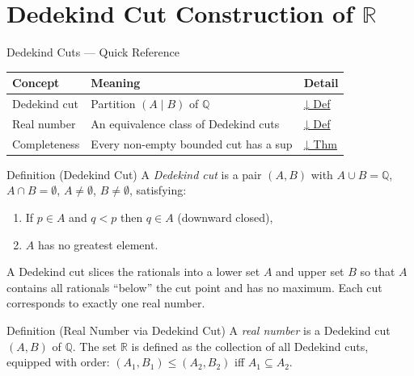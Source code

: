 
\section{Dedekind Cut Construction of $\mathbb{R}$}

\begin{toolkitbox}{Dedekind Cuts — Quick Reference}
\small
\begin{tabular}{l l l}
\toprule
\textbf{Concept} & \textbf{Meaning} & \textbf{Detail} \\
\midrule
Dedekind cut  & Partition $(A \mid B)$ of $\mathbb{Q}$ & \hyperref[def:dedekind-cut]{↓ Def} \\
Real number   & An equivalence class of Dedekind cuts & \hyperref[def:real-as-cut]{↓ Def} \\
Completeness  & Every non-empty bounded cut has a sup & \hyperref[thm:dedekind-complete]{↓ Thm} \\
\bottomrule
\end{tabular}
\end{toolkitbox}


\begin{definitionbox}{Definition (Dedekind Cut)}
\label{def:dedekind-cut}
A \emph{Dedekind cut} is a pair $(A, B)$ with $A \cup B = \mathbb{Q}$,
$A \cap B = \emptyset$, $A \neq \emptyset$, $B \neq \emptyset$, satisfying:
\begin{enumerate}
  \item If $p \in A$ and $q < p$ then $q \in A$ \quad (downward closed),
  \item $A$ has no greatest element.
\end{enumerate}
\end{definitionbox}

\begin{remark*}
A Dedekind cut slices the rationals into a lower set $A$ and upper set $B$
so that $A$ contains all rationals ``below'' the cut point and has no maximum.
Each cut corresponds to exactly one real number.
\end{remark*}

\begin{definitionbox}{Definition (Real Number via Dedekind Cut)}
\label{def:real-as-cut}
A \emph{real number} is a Dedekind cut $(A, B)$ of $\mathbb{Q}$.
The set $\mathbb{R}$ is defined as the collection of all Dedekind cuts,
equipped with order: $(A_1, B_1) \leq (A_2, B_2)$ iff $A_1 \subseteq A_2$.
\end{definitionbox}

